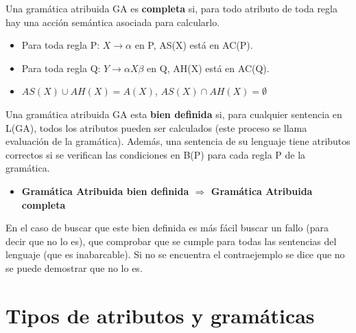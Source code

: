 \documentclass[12pt]{report} %
\begin{document}
Una gramática atribuida GA es \textbf{completa} si, para todo atributo de toda regla hay una acción semántica asociada para calcularlo.
\begin{itemize}
  \item Para toda regla P: $X\rightarrow\alpha$ en P, AS(X) está en AC(P).
  \item Para toda regla Q: $Y\rightarrow\alpha X \beta$ en Q, AH(X) está en AC(Q).
  \item $AS(X) \cup AH(X) = A(X)$, $AS(X) \cap AH(X)=\emptyset$
\end{itemize}

Una gramática atribuida GA esta \textbf{bien definida} si, para cualquier sentencia en L(GA), todos los atributos pueden ser calculados (este proceso se llama evaluación de la gramática). Además, una sentencia de su lenguaje tiene atributos correctos si se verifican las condiciones en B(P) para cada regla P de la gramática.
\begin{itemize}
  \item \textbf{Gramática Atribuida bien definida $\Rightarrow$ Gramática Atribuida completa}
\end{itemize}
En el caso de buscar que este bien definida es más fácil buscar un fallo (para decir que no lo es), que comprobar que se cumple para todas las sentencias del lenguaje (que es inabarcable). Si no se encuentra el contraejemplo se dice que no se puede demostrar que no lo es.

\section{Tipos de atributos y gramáticas}
\end{document}
